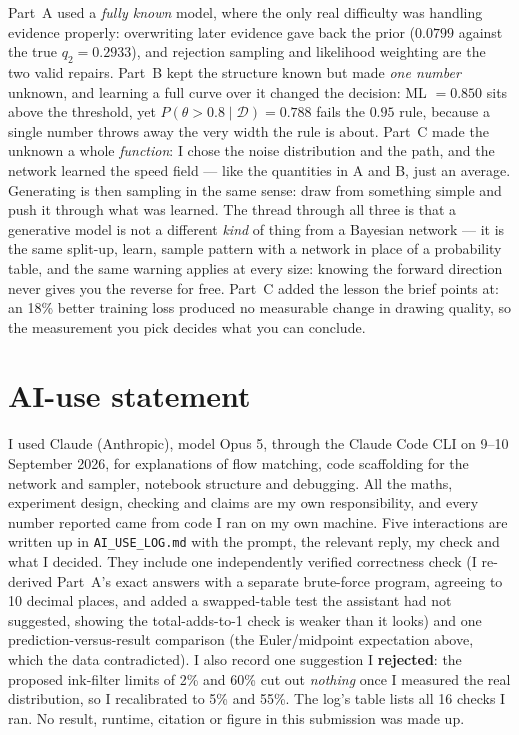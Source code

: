 \documentclass[12pt,a4paper]{article}
\newcommand{\D}{\mathcal{D}}
\begin{document}
Part~A used a \emph{fully known} model, where the only real difficulty was handling evidence properly:
overwriting later evidence gave back the prior ($0.0799$ against the true $q_2=0.2933$), and rejection sampling
and likelihood weighting are the two valid repairs. Part~B kept the structure known but made \emph{one number}
unknown, and learning a full curve over it changed the decision: ML $=0.850$ sits above the threshold, yet
$P(\theta>0.8\mid\D)=0.788$ fails the $0.95$ rule, because a single number throws away the very width the rule
is about. Part~C made the unknown a whole \emph{function}: I chose the noise distribution and the path, and the
network learned the speed field --- like the quantities in A and B, just an average. Generating is then sampling
in the same sense: draw from something simple and push it through what was learned. The thread through all three
is that a generative model is not a different \emph{kind} of thing from a Bayesian network --- it is the same
split-up, learn, sample pattern with a network in place of a probability table, and the same warning applies at
every size: knowing the forward direction never gives you the reverse for free. Part~C added the lesson the brief
points at: an 18\% better training loss produced no measurable change in drawing quality, so the measurement you
pick decides what you can conclude.

\section*{AI-use statement}

I used Claude (Anthropic), model Opus 5, through the Claude Code CLI on 9--10 September 2026, for explanations
of flow matching, code scaffolding for the network and sampler, notebook structure and debugging. All the maths,
experiment design, checking and claims are my own responsibility, and every number reported came from code I ran
on my own machine. Five interactions are written up in \texttt{AI\_USE\_LOG.md} with the prompt, the relevant
reply, my check and what I decided. They include one independently verified correctness check (I re-derived
Part~A's exact answers with a separate brute-force program, agreeing to 10 decimal places, and added a
swapped-table test the assistant had not suggested, showing the total-adds-to-1 check is weaker than it looks)
and one prediction-versus-result comparison (the Euler/midpoint expectation above, which the data contradicted).
I also record one suggestion I \textbf{rejected}: the proposed ink-filter limits of 2\% and 60\% cut out
\emph{nothing} once I measured the real distribution, so I recalibrated to 5\% and 55\%. The log's table lists all
16 checks I ran. No result, runtime, citation or figure in this submission was made up.
\end{document}
